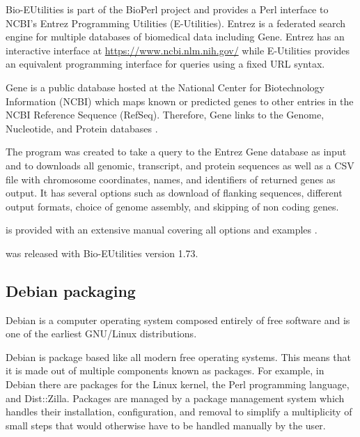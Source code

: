 Bio-EUtilities is part of the BioPerl project and provides a Perl
interface to NCBI's Entrez Programming Utilities (E-Utilities).
Entrez is a federated search engine for multiple databases of
biomedical data including Gene.  Entrez has an
interactive interface at \url{https://www.ncbi.nlm.nih.gov/} while
E-Utilities provides an equivalent
programming interface for queries using a fixed
URL syntax.

Gene is a public database hosted at the National Center for
Biotechnology Information (NCBI) which maps known or predicted genes
to other entries in the NCBI Reference Sequence (RefSeq).  Therefore, Gene
links to the Genome, Nucleotide, and Protein databases \citep{gene-database}.

The program  was
created to take a query to the Entrez Gene database as input and
to downloads all genomic, transcript, and protein sequences as well
as a CSV file with chromosome coordinates, names, and identifiers of
returned genes as output.
It has several options such as download of flanking sequences, different
output formats, choice of genome assembly, and skipping of non coding
genes.

is provided with an extensive manual covering all options
and examples .

 was released with
Bio-EUtilities version 1.73.

\subsection{Debian packaging}

Debian is a computer operating system
composed entirely of free software and is one of the earliest GNU/Linux
distributions.

Debian is package based like all modern free operating systems.
This means that it is made out of multiple components known as
packages.  For example, in Debian there are packages for the Linux
kernel, the Perl programming language, and Dist::Zilla.  Packages are
managed by a package management system which handles their
installation, configuration, and removal to simplify
a multiplicity of small steps that would otherwise
have to be handled manually by the user.


